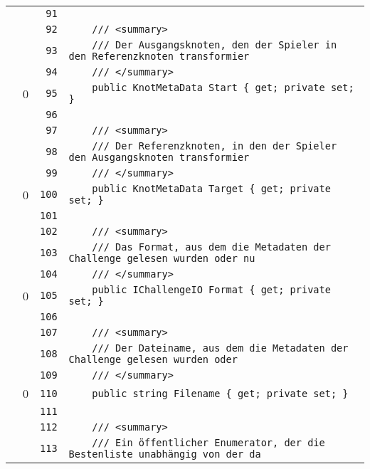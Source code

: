 \documentclass[a4paper,10pt]{article}
\begin{document}
\begin{longtable}[l]{lrrl}
\cellcolor{gray} &  & \verb~91~ & \verb~~\\
\cellcolor{gray} &  & \verb~92~ & \verb~    /// <summary>~\\
\cellcolor{gray} &  & \verb~93~ & \verb~    /// Der Ausgangsknoten, den der Spieler in den Referenzknoten transformier~\\
\cellcolor{gray} &  & \verb~94~ & \verb~    /// </summary>~\\
\cellcolor{red} & 0 & \verb~95~ & \verb~    public KnotMetaData Start { get; private set; }~\\
\cellcolor{gray} &  & \verb~96~ & \verb~~\\
\cellcolor{gray} &  & \verb~97~ & \verb~    /// <summary>~\\
\cellcolor{gray} &  & \verb~98~ & \verb~    /// Der Referenzknoten, in den der Spieler den Ausgangsknoten transformier~\\
\cellcolor{gray} &  & \verb~99~ & \verb~    /// </summary>~\\
\cellcolor{red} & 0 & \verb~100~ & \verb~    public KnotMetaData Target { get; private set; }~\\
\cellcolor{gray} &  & \verb~101~ & \verb~~\\
\cellcolor{gray} &  & \verb~102~ & \verb~    /// <summary>~\\
\cellcolor{gray} &  & \verb~103~ & \verb~    /// Das Format, aus dem die Metadaten der Challenge gelesen wurden oder nu~\\
\cellcolor{gray} &  & \verb~104~ & \verb~    /// </summary>~\\
\cellcolor{red} & 0 & \verb~105~ & \verb~    public IChallengeIO Format { get; private set; }~\\
\cellcolor{gray} &  & \verb~106~ & \verb~~\\
\cellcolor{gray} &  & \verb~107~ & \verb~    /// <summary>~\\
\cellcolor{gray} &  & \verb~108~ & \verb~    /// Der Dateiname, aus dem die Metadaten der Challenge gelesen wurden oder~\\
\cellcolor{gray} &  & \verb~109~ & \verb~    /// </summary>~\\
\cellcolor{red} & 0 & \verb~110~ & \verb~    public string Filename { get; private set; }~\\
\cellcolor{gray} &  & \verb~111~ & \verb~~\\
\cellcolor{gray} &  & \verb~112~ & \verb~    /// <summary>~\\
\cellcolor{gray} &  & \verb~113~ & \verb~    /// Ein öffentlicher Enumerator, der die Bestenliste unabhängig von der da~\\

\end{longtable}
\end{document}
